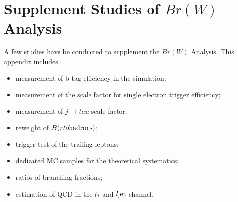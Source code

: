 \chapter{Supplement Studies of $Br(W)$ Analysis}

A few studies have be conducted to supplement the $Br(W)$ Analysis. This appendix includes 
\begin{itemize}
    \item measurement of b-tag efficiency in the simulation;
    \item measurement of the scale factor for single electron trigger efficiency;
    \item measurement of $j \to tau$ scale factor;
    \item reweight of $B(\tau \to  \rm{hadrons})$;
    \item trigger test of the trailing leptons;
    \item dedicated MC samples for the \ttbar theoretical systematics;
    \item ratios of branching fractions;
    \item estimation of QCD in the $l\tau$ and $l\rm{jet}$ channel. 
\end{itemize}










